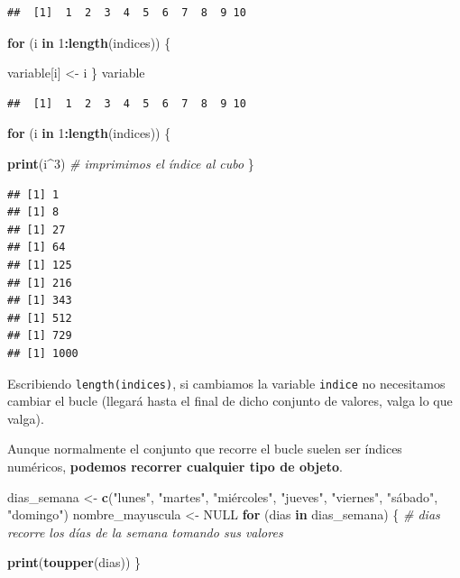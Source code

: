 \documentclass[11pt,]{book}
\newenvironment{Shaded}{\begin{snugshade}}{\end{snugshade}}
\newcommand{\CommentTok}[1]{\textcolor[rgb]{0.37,0.37,0.37}{\textit{#1}}}
\newcommand{\ControlFlowTok}[1]{\textcolor[rgb]{0.27,0.27,0.27}{\textbf{#1}}}
\newcommand{\DecValTok}[1]{\textcolor[rgb]{0.06,0.06,0.06}{#1}}
\newcommand{\KeywordTok}[1]{\textcolor[rgb]{0.27,0.27,0.27}{\textbf{#1}}}
\newcommand{\NormalTok}[1]{#1}
\newcommand{\OperatorTok}[1]{\textcolor[rgb]{0.43,0.43,0.43}{\textbf{#1}}}
\newcommand{\OtherTok}[1]{\textcolor[rgb]{0.37,0.37,0.37}{#1}}
\newcommand{\StringTok}[1]{\textcolor[rgb]{0.5,0.5,0.5}{#1}}
\begin{document}
\begin{verbatim}
##  [1]  1  2  3  4  5  6  7  8  9 10
\end{verbatim}

\begin{Shaded}
\begin{Highlighting}[]
\ControlFlowTok{for}\NormalTok{ (i }\ControlFlowTok{in} \DecValTok{1}\OperatorTok{:}\KeywordTok{length}\NormalTok{(indices)) \{ }
  
\NormalTok{  variable[i] <-}\StringTok{ }\NormalTok{i}
\NormalTok{\}}
\NormalTok{variable}
\end{Highlighting}
\end{Shaded}

\begin{verbatim}
##  [1]  1  2  3  4  5  6  7  8  9 10
\end{verbatim}

\begin{Shaded}
\begin{Highlighting}[]
\ControlFlowTok{for}\NormalTok{ (i }\ControlFlowTok{in} \DecValTok{1}\OperatorTok{:}\KeywordTok{length}\NormalTok{(indices)) \{ }
  
  \KeywordTok{print}\NormalTok{(i}\OperatorTok{^}\DecValTok{3}\NormalTok{) }\CommentTok{# imprimimos el índice al cubo}
\NormalTok{\}}
\end{Highlighting}
\end{Shaded}

\begin{verbatim}
## [1] 1
## [1] 8
## [1] 27
## [1] 64
## [1] 125
## [1] 216
## [1] 343
## [1] 512
## [1] 729
## [1] 1000
\end{verbatim}

Escribiendo \texttt{length(indices)}, si cambiamos la variable \texttt{indice} no necesitamos cambiar el bucle (llegará hasta el final de dicho conjunto de valores, valga lo que valga).

Aunque normalmente el conjunto que recorre el bucle suelen ser índices numéricos, \textbf{podemos recorrer cualquier tipo de objeto}.

\begin{Shaded}
\begin{Highlighting}[]
\NormalTok{dias_semana <-}\StringTok{ }\KeywordTok{c}\NormalTok{(}\StringTok{"lunes"}\NormalTok{, }\StringTok{"martes"}\NormalTok{, }\StringTok{"miércoles"}\NormalTok{, }\StringTok{"jueves"}\NormalTok{,}
                 \StringTok{"viernes"}\NormalTok{, }\StringTok{"sábado"}\NormalTok{, }\StringTok{"domingo"}\NormalTok{)}
\NormalTok{nombre_mayuscula <-}\StringTok{ }\OtherTok{NULL}
\ControlFlowTok{for}\NormalTok{ (dias }\ControlFlowTok{in}\NormalTok{ dias_semana) \{ }\CommentTok{# dias recorre los días de la semana tomando sus valores}
  
  \KeywordTok{print}\NormalTok{(}\KeywordTok{toupper}\NormalTok{(dias))}
\NormalTok{\}}
\end{Highlighting}
\end{Shaded}
\end{document}
